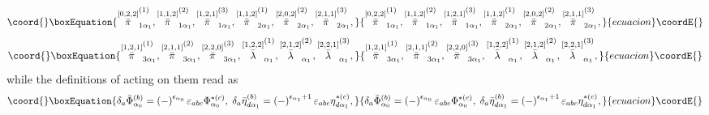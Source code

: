 \documentclass[a4paper,12pt]{article}
\begin{document}
\begin{equation}\coord{}\boxEquation{
\stackrel{\left[ 0,2,2\right] }{\bar{\pi}}_{1\alpha _{1}}^{(1)},\stackrel{
\left[ 1,1,2\right] }{\bar{\pi}}_{1\alpha _{1}}^{(2)},\stackrel{\left[
1,2,1\right] }{\bar{\pi}}_{1\alpha _{1}}^{(3)},\stackrel{\left[ 1,1,2\right] 
}{\bar{\pi}}_{2\alpha _{1}}^{(1)},\stackrel{\left[ 2,0,2\right] }{\bar{\pi}}
_{2\alpha _{1}}^{(2)},\stackrel{\left[ 2,1,1\right] }{\bar{\pi}}_{2\alpha
_{1}}^{(3)},  \label{sp3.44}
}{
\stackrel{\left[ 0,2,2\right] }{\bar{\pi}}_{1\alpha _{1}}^{(1)},\stackrel{
\left[ 1,1,2\right] }{\bar{\pi}}_{1\alpha _{1}}^{(2)},\stackrel{\left[
1,2,1\right] }{\bar{\pi}}_{1\alpha _{1}}^{(3)},\stackrel{\left[ 1,1,2\right] 
}{\bar{\pi}}_{2\alpha _{1}}^{(1)},\stackrel{\left[ 2,0,2\right] }{\bar{\pi}}
_{2\alpha _{1}}^{(2)},\stackrel{\left[ 2,1,1\right] }{\bar{\pi}}_{2\alpha
_{1}}^{(3)},  }{ecuacion}\coordE{}\end{equation}
\begin{equation}\coord{}\boxEquation{
\stackrel{\left[ 1,2,1\right] }{\bar{\pi}}_{3\alpha _{1}}^{(1)},\stackrel{
\left[ 2,1,1\right] }{\bar{\pi}}_{3\alpha _{1}}^{(2)},\stackrel{\left[
2,2,0\right] }{\bar{\pi}}_{3\alpha _{1}}^{(3)},\stackrel{\left[ 1,2,2\right] 
}{\bar{\lambda}}_{\alpha _{1}}^{(1)},\stackrel{\left[ 2,1,2\right] }{\bar{
\lambda}}_{\alpha _{1}}^{(2)},\stackrel{\left[ 2,2,1\right] }{\bar{\lambda}}
_{\alpha _{1}}^{(3)},  \label{sp3.45}
}{
\stackrel{\left[ 1,2,1\right] }{\bar{\pi}}_{3\alpha _{1}}^{(1)},\stackrel{
\left[ 2,1,1\right] }{\bar{\pi}}_{3\alpha _{1}}^{(2)},\stackrel{\left[
2,2,0\right] }{\bar{\pi}}_{3\alpha _{1}}^{(3)},\stackrel{\left[ 1,2,2\right] 
}{\bar{\lambda}}_{\alpha _{1}}^{(1)},\stackrel{\left[ 2,1,2\right] }{\bar{
\lambda}}_{\alpha _{1}}^{(2)},\stackrel{\left[ 2,2,1\right] }{\bar{\lambda}}
_{\alpha _{1}}^{(3)},  }{ecuacion}\coordE{}\end{equation}
while the definitions of \coordHE{} acting on them read as 
\begin{equation}\coord{}\boxEquation{
\delta _{a}\bar{\Phi}_{\alpha _{0}}^{(b)}=\left( -\right) ^{\epsilon
_{\alpha _{0}}}\varepsilon _{abc}\Phi _{\alpha _{0}}^{*(c)},\;\delta _{a}
\bar{\eta}_{d\alpha _{1}}^{(b)}=\left( -\right) ^{\epsilon _{\alpha
_{1}}+1}\varepsilon _{abc}\eta _{d\alpha _{1}}^{*(c)},  \label{sp3.46}
}{
\delta _{a}\bar{\Phi}_{\alpha _{0}}^{(b)}=\left( -\right) ^{\epsilon
_{\alpha _{0}}}\varepsilon _{abc}\Phi _{\alpha _{0}}^{*(c)},\;\delta _{a}
\bar{\eta}_{d\alpha _{1}}^{(b)}=\left( -\right) ^{\epsilon _{\alpha
_{1}}+1}\varepsilon _{abc}\eta _{d\alpha _{1}}^{*(c)},  }{ecuacion}\coordE{}\end{equation}
\end{document}
